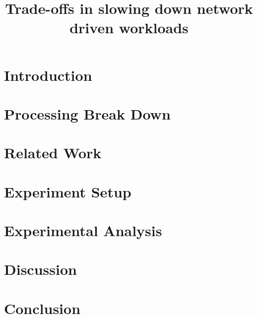 \documentclass[sigplan,10pt]{acmart}
\begin{document}
\title{Trade-offs in slowing down network driven workloads}


\maketitle
\pagestyle{plain} %

\section{Introduction}


\section{Processing Break Down}


\section{Related Work}


\section{Experiment Setup}


\section{Experimental Analysis}





\section{Discussion}


\section{Conclusion}



\end{document}
